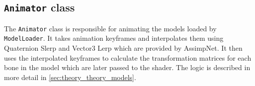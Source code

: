 \subsection{\texttt{Animator} class}\label{subsec:animator-class}

The \texttt{Animator} class is responsible for animating the models loaded by \texttt{ModelLoader}.
It takes animation keyframes and interpolates them using Quaternion Slerp and Vector3 Lerp which are provided by AssimpNet.
It then uses the interpolated keyframes to calculate the transformation matrices for each bone in the model which are later passed to the shader.
The logic is described in more detail in \autoref{sec:theory_theory_models}.